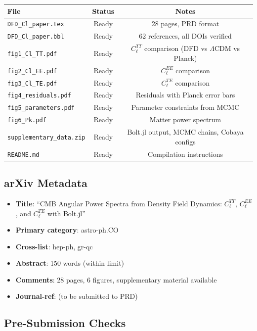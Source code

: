 \documentclass[11pt,a4paper]{article}
\begin{document}
\begin{center}
\begin{tabular}{lcc}
\toprule
\textbf{File} & \textbf{Status} & \textbf{Notes} \\
\midrule
\texttt{DFD\_Cl\_paper.tex} & Ready & 28 pages, PRD format \\
\texttt{DFD\_Cl\_paper.bbl} & Ready & 62 references, all DOIs verified \\
\texttt{fig1\_Cl\_TT.pdf} & Ready & $C_\ell^{TT}$ comparison (DFD vs $\Lambda$CDM vs Planck) \\
\texttt{fig2\_Cl\_EE.pdf} & Ready & $C_\ell^{EE}$ comparison \\
\texttt{fig3\_Cl\_TE.pdf} & Ready & $C_\ell^{TE}$ comparison \\
\texttt{fig4\_residuals.pdf} & Ready & Residuals with Planck error bars \\
\texttt{fig5\_parameters.pdf} & Ready & Parameter constraints from MCMC \\
\texttt{fig6\_Pk.pdf} & Ready & Matter power spectrum \\
\texttt{supplementary\_data.zip} & Ready & Bolt.jl output, MCMC chains, Cobaya configs \\
\texttt{README.md} & Ready & Compilation instructions \\
\bottomrule
\end{tabular}
\end{center}

\subsection{arXiv Metadata}

\begin{itemize}
\item \textbf{Title}: ``CMB Angular Power Spectra from Density Field Dynamics: $C_\ell^{TT}$, $C_\ell^{EE}$, and $C_\ell^{TE}$ with Bolt.jl''
\item \textbf{Primary category}: astro-ph.CO
\item \textbf{Cross-list}: hep-ph, gr-qc
\item \textbf{Abstract}: 150 words (within limit)
\item \textbf{Comments}: 28 pages, 6 figures, supplementary material available
\item \textbf{Journal-ref}: (to be submitted to PRD)
\end{itemize}

\subsection{Pre-Submission Checks}
\end{document}
